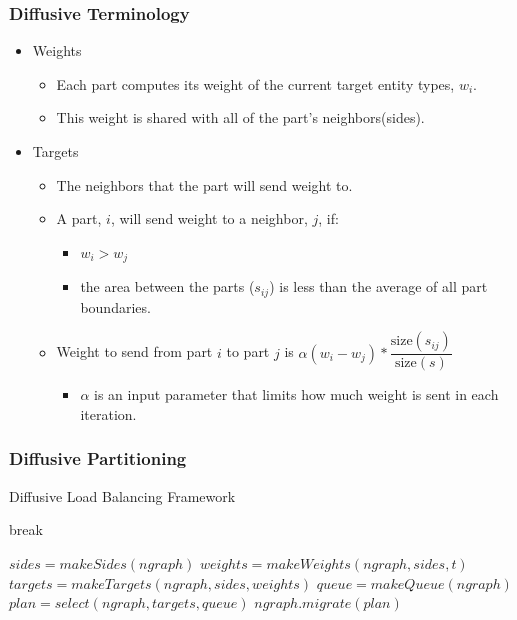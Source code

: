\documentclass{beamer}
\begin{document}
\begin{frame}
  \frametitle{Diffusive Terminology}
  \begin{itemize}
  \item Weights
    \begin{itemize}
    \item Each part computes its weight of the current target entity types, $w_i$.
    \item This weight is shared with all of the part's neighbors(sides).
    \end{itemize}
  \item Targets
    \begin{itemize}
    \item The neighbors that the part will send weight to.
    \item A part, $i$, will send weight to a neighbor, $j$, if:
      \begin{itemize}
      \item $w_i>w_j$
      \item the area between the parts ($s_{ij}$) is less than the average of all part boundaries.  
      \end{itemize}
    \item Weight to send from part $i$ to part $j$ is $\alpha(w_i-w_j)*\dfrac{\text{size}(s_{ij})}{\text{size}(s)}$
      \begin{itemize}
        \item $\alpha$ is an input parameter that limits how much weight is sent in each iteration.
      \end{itemize}
    \end{itemize}
  \end{itemize}
\end{frame}

\begin{frame}
  \frametitle{Diffusive Partitioning}
  \begin{algorithm}[H]
    \caption{Diffusive Load Balancing Framework}
    \label{alg:engpar}
    \small
    \begin{algorithmic}[1]
      \State break
      \EndIf
      \EndWhile
      \EndFor
      \EndProcedure

      \State $sides = makeSides(ngraph)$
      \State $weights = makeWeights(ngraph,sides,t)$
      \State $targets = makeTargets(ngraph,sides,weights)$
      \State $queue = makeQueue(ngraph)$
      \State $plan = select(ngraph,targets,queue)$
      \State $ngraph.migrate(plan)$
      \EndProcedure
    \end{algorithmic}
  \end{algorithm}
\end{frame}
\end{document}
